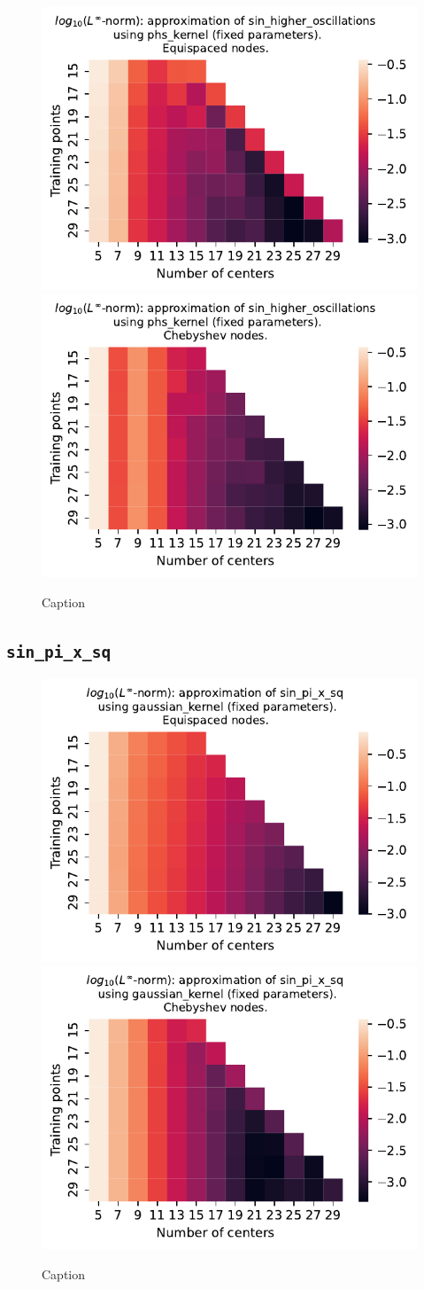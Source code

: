 \documentclass[12pt]{report} %
\begin{document}
\begin{figure}[ht]
  \centering

  \includegraphics[width=.49\textwidth]{imagenes/experiments/1d/least_squares/opt-sin_higher_oscillations-Kphs_kernel-Equi.pdf}
  \includegraphics[width=.49\textwidth]{imagenes/experiments/1d/least_squares/opt-sin_higher_oscillations-Kphs_kernel-Cheb.pdf}
  \caption{Caption}
  \label{fig:opt-sin-higher-oscillations-phs}
\end{figure}

\subsection*{\texttt{sin\_pi\_x\_sq}}

\begin{figure}[ht]
  \centering

  \includegraphics[width=.49\textwidth]{imagenes/experiments/1d/least_squares/opt-sin_pi_x_sq-Kgaussian_kernel-Equi.pdf}
  \includegraphics[width=.49\textwidth]{imagenes/experiments/1d/least_squares/opt-sin_pi_x_sq-Kgaussian_kernel-Cheb.pdf}
  \caption{Caption}
  \label{fig:opt-sin-pi-x-sq-gaussian}
\end{figure}
\end{document}
